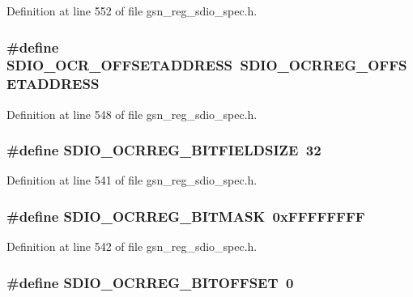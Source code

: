 Definition at line 552 of file gsn\_\-reg\_\-sdio\_\-spec.h.

\hypertarget{a00571_acff4cc256bb3b00842b2e6771d204c54}{
\subsubsection[{SDIO\_\-OCR\_\-OFFSETADDRESS}]{\setlength{\rightskip}{0pt plus 5cm}\#define SDIO\_\-OCR\_\-OFFSETADDRESS~SDIO\_\-OCRREG\_\-OFFSETADDRESS}}
\label{a00571_acff4cc256bb3b00842b2e6771d204c54}


Definition at line 548 of file gsn\_\-reg\_\-sdio\_\-spec.h.

\hypertarget{a00571_a4c04be04e1f65a2dde1b0abe254751e8}{
\subsubsection[{SDIO\_\-OCRREG\_\-BITFIELDSIZE}]{\setlength{\rightskip}{0pt plus 5cm}\#define SDIO\_\-OCRREG\_\-BITFIELDSIZE~32}}
\label{a00571_a4c04be04e1f65a2dde1b0abe254751e8}


Definition at line 541 of file gsn\_\-reg\_\-sdio\_\-spec.h.

\hypertarget{a00571_a7dd4f3efbe16eae653362abdfc20b6e7}{
\subsubsection[{SDIO\_\-OCRREG\_\-BITMASK}]{\setlength{\rightskip}{0pt plus 5cm}\#define SDIO\_\-OCRREG\_\-BITMASK~0xFFFFFFFF}}
\label{a00571_a7dd4f3efbe16eae653362abdfc20b6e7}


Definition at line 542 of file gsn\_\-reg\_\-sdio\_\-spec.h.

\hypertarget{a00571_a0c61121f7f58f9f4ec70fe2c0bcd5718}{
\subsubsection[{SDIO\_\-OCRREG\_\-BITOFFSET}]{\setlength{\rightskip}{0pt plus 5cm}\#define SDIO\_\-OCRREG\_\-BITOFFSET~0}}
\label{a00571_a0c61121f7f58f9f4ec70fe2c0bcd5718}


